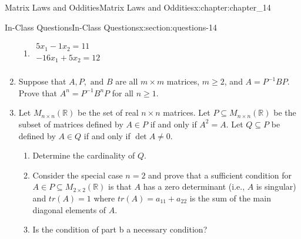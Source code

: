 \documentclass[oneside,10pt,]{book}
\numberwithin{equation}{section}
\begin{document}
\begin{chapterptx}{Matrix Laws and Oddities}{}{Matrix Laws and Oddities}{}{}{x:chapter:chapter_14}
\begin{sectionptx}{In-Class Questions}{}{In-Class Questions}{}{}{x:section:questions-14}
\begin{enumerate}[label=\arabic*.]
\begin{multicols}{2}
\begin{enumerate}[label=(\alph*)]
\item{}\(\begin{array}{c}5x_1-1x_2= 11\\
-16x_1 +5x_2= 12\\
\end{array}\)%
\end{enumerate}
\end{multicols}
%
\item{}Suppose that \(A, P, \textrm{ and } B\) are all \(m \times m\) matrices, \(m \geq 2\), and \(A= P^{-1} B P\). Prove that  \(A^n = P^{-1} B^n P\) for all \(n \geq 1\).%
\item{}Let \(M_{n\times n}(\mathbb{R})\) be the set of real \(n\times n\) matrices. Let \(P \subseteq  M_{n\times n}(\mathbb{R})\) be the subset of matrices defined by \(A \in  P\) if and only if \(A^2 = A\). Let \(Q \subseteq  P\) be defined by \(A\in Q\) if and only if \(\det A \neq  0\).%
\par
%
\begin{enumerate}[label=(\alph*)]
\item{}Determine the cardinality of \(Q\).%
\item{}Consider the special case \(n = 2\) and prove that a sufficient condition for \(A \in  P \subseteq  M_{2\times 2}(\mathbb{R})\) is that \(A\) has a zero determinant (i.e., \(A\) is singular) and \(tr(A) = 1\) where \(tr(A) = a_{11}+ a _{22}\) is the sum of the main diagonal elements of \(A\).%
\item{}Is the condition of part b a necessary condition?%
\end{enumerate}
%
\end{enumerate}
%
\end{sectionptx}
\end{chapterptx}
%
%
\typeout{************************************************}
\typeout{************************************************}
%
\end{document}
